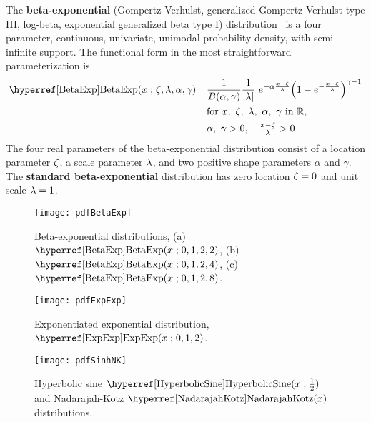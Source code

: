 

\label{sec:BetaExp}

{}
{}
The {\bf beta-exponential} (Gompertz-Verhulst, generalized Gompertz-Verhulst type III, 
log-beta, exponential generalized beta type I) distribution~\cite{Ahuja1967,Nadarajah2006, Iyer-Biswas2014a} is a four parameter, continuous, univariate, unimodal probability density, with  semi-infinite  support. The functional form in the most straightforward parameterization is
\begin{align}
\label{BetaExp}
\opr{BetaExp}(x\given \pLoc,\pScale,\alpha, \gamma) =&
 \frac{1}{B(\alpha, \gamma)} \frac{1}{|\pScale|}\
 e^{-\alpha \frac{x-\pLoc}{\pScale} }  \Left(1 - e^{-\frac{x-\pLoc}{\pScale}  }\Right)^{\gamma-1} 
 \checked
 \\ \notag
 & \text{for } x,\ \pLoc,\ \pScale,\ \alpha,\  \gamma \text{ in } \mathbb{R}, \checked
 \\ \notag & \alpha,\ \gamma >0,\quad  \tfrac{x-\pLoc}{\pScale} >0 \checked
\end{align}
The four real parameters of the beta-exponential  distribution consist of a location parameter $\zeta$, a scale parameter $\lambda$, and two positive shape parameters $\alpha$ and $\gamma$. The {\bf standard beta-exponential} distribution has zero location $\zeta=0$ and unit scale $\lambda=1$.


\begin{figure}[p]
\begin{center}
\texttt{[image: pdfBetaExp]}
\end{center}
\caption[Beta-exponential distributions]{Beta-exponential distributions, (a) $\opr{BetaExp}(x\given 0,1,2, 2)$,
(b) $\opr{BetaExp}(x\given 0, 1, 2, 4)$,
(c) $\opr{BetaExp}(x\given 0, 1, 2, 8)$.
}
\end{figure}

\begin{figure}[p]
\begin{center}
\texttt{[image: pdfExpExp]}
\end{center}
\caption[Exponentiated exponential distribution]{Exponentiated exponential distribution, $\opr{ExpExp}(x\given 0,1,2)$.
}
\end{figure}


\begin{figure}[ht]
\begin{center}
\texttt{[image: pdfSinhNK]}
\end{center}
\caption[Hyperbolic sine and Nadarajah-Kotz distributions.]{Hyperbolic sine  $\opr{HyperbolicSine}(x\given \tfrac{1}{2})$ and Nadarajah-Kotz $\opr{NadarajahKotz}(x)$ distributions. }
\end{figure}



